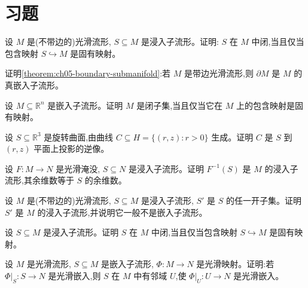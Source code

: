 \documentclass[../../main.tex]{subfiles}
\begin{document}
\section{习题}\label{section:ch05-习题}

\begin{exercise}\label{exercise:ch05-p5-1}
设 $M$ 是(不带边的)光滑流形, $S\subseteq M$ 是浸入子流形。证明: $S$ 在 $M$ 中闭,当且仅当包含映射 $S\hookrightarrow M$ 是固有映射。
\end{exercise}

\begin{exercise}\label{exercise:ch05-p5-2}
证明\cref{theorem:ch05-boundary-submanifold}:若 $M$ 是带边光滑流形,则 $\partial M$ 是 $M$ 的真嵌入子流形。
\end{exercise}

\begin{exercise}\label{exercise:ch05-p5-3}
设 $M\subseteq\mathbb{R}^n$ 是嵌入子流形。证明 $M$ 是闭子集,当且仅当它在 $M$ 上的包含映射是固有映射。
\end{exercise}

\begin{exercise}\label{exercise:ch05-p5-4}
设 $S\subseteq\mathbb{R}^3$ 是旋转曲面,由曲线 $C\subseteq H=\{(r,z):r>0\}$ 生成。证明 $C$ 是 $S$ 到 $(r,z)$ 平面上投影的逆像。
\end{exercise}

\begin{exercise}\label{exercise:ch05-p5-5}
设 $F:M\to N$ 是光滑淹没, $S\subseteq N$ 是浸入子流形。证明 $F^{-1}(S)$ 是 $M$ 的浸入子流形,其余维数等于 $S$ 的余维数。
\end{exercise}

\begin{exercise}\label{exercise:ch05-p5-6}
设 $M$ 是(不带边的)光滑流形, $S\subseteq M$ 是浸入子流形, $S'$ 是 $S$ 的任一开子集。证明 $S'$ 是 $M$ 的浸入子流形,并说明它一般不是嵌入子流形。
\end{exercise}

\begin{exercise}\label{exercise:ch05-p5-7}
设 $S\subseteq M$ 是浸入子流形。证明 $S$ 在 $M$ 中闭,当且仅当包含映射 $S\hookrightarrow M$ 是固有映射。
\end{exercise}

\begin{exercise}\label{exercise:ch05-p5-8}
设 $M$ 是光滑流形, $S\subseteq M$ 是嵌入子流形, $\Phi:M\to N$ 是光滑映射。证明:若 $\Phi|_S:S\to N$ 是光滑嵌入,则 $S$ 在 $M$ 中有邻域 $U$,使 $\Phi|_U:U\to N$ 是光滑嵌入。
\end{exercise}
\end{document}
